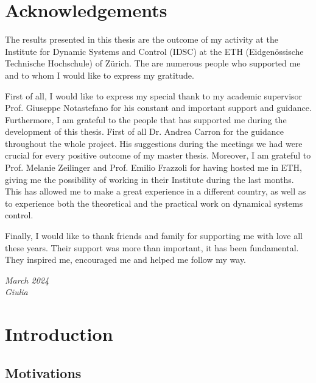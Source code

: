 \documentclass[a4paper,12pt,oneside]{book}
\begin{document}
\chapter*{Acknowledgements }
The results presented in this thesis are the outcome of my activity at the Institute for Dynamic Systems and Control (IDSC) at the ETH (Eidgen\"ossische Technische Hochschule) of Z\"urich.
The are numerous people who supported me and to whom I would like to express my gratitude.

\bigskip
First of all, I would like to express my special thank to my academic supervisor Prof. Giuseppe Notastefano for his constant and important support and guidance.
Furthermore, I am grateful to the people that has supported me during the development of this thesis. 
First of all Dr. Andrea Carron for the guidance throughout the whole project. 
His suggestions during the meetings we had were crucial for every positive outcome of my master thesis.
Moreover, I am grateful to Prof. Melanie Zeilinger and Prof. Emilio Frazzoli for having hosted me in ETH, giving me the possibility of working in their Institute during the last months.
This has allowed me to make a great experience in a different country, as well as to experience both the theoretical and the practical work on dynamical systems control.

\bigskip
Finally, I would like to thank friends and family for supporting me with love all these years. Their support was more than important, it has been fundamental. 
They inspired me, encouraged me and helped me follow my way.

\begin{flushright}
\vspace{10mm}
\textit{March 2024 \\
\vspace{3mm}
Giulia}
\end{flushright}




\tableofcontents




\chapter*{Introduction}
	
\section*{Motivations}
\end{document}
